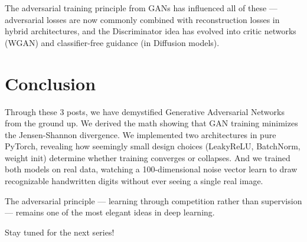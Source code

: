 \documentclass[12pt]{article}
\begin{document}
The adversarial training principle from GANs has influenced all of these --- adversarial losses are now commonly combined with reconstruction losses in hybrid architectures, and the Discriminator idea has evolved into critic networks (WGAN) and classifier-free guidance (in Diffusion models).

\section{Conclusion}
Through these 3 posts, we have demystified Generative Adversarial Networks from the ground up. We derived the math showing that GAN training minimizes the Jensen-Shannon divergence. We implemented two architectures in pure PyTorch, revealing how seemingly small design choices (LeakyReLU, BatchNorm, weight init) determine whether training converges or collapses. And we trained both models on real data, watching a 100-dimensional noise vector learn to draw recognizable handwritten digits without ever seeing a single real image.

The adversarial principle --- learning through competition rather than supervision --- remains one of the most elegant ideas in deep learning.

Stay tuned for the next series!
\end{document}
